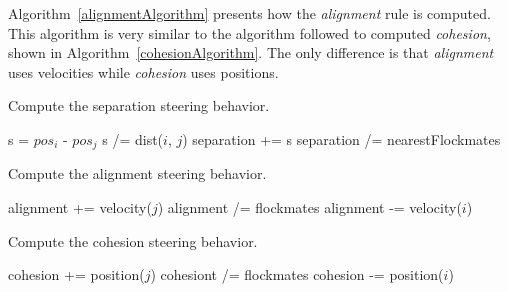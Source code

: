 Algorithm~\ref{alignmentAlgorithm} presents how the \textit{alignment} rule is computed. This algorithm is very similar to the algorithm followed to computed \textit{cohesion}, shown in Algorithm~\ref{cohesionAlgorithm}. The only difference is that \textit{alignment} uses velocities while \textit{cohesion} uses positions.

\begin{algorithm}
\caption{Compute the separation steering behavior.}
\label{separationAlgorithm}
\begin{algorithmic}
\STATE s = $pos_i$ - $pos_j$ 
\STATE s /= dist($i$, $j$) 
\STATE separation += s
\ENDIF
\ENDFOR
{}
\STATE separation /= nearestFlockmates
\ENDIF
\end{algorithmic}
\end{algorithm}




\begin{algorithm}
\caption{Compute the alignment steering behavior.}
\label{alignmentAlgorithm}
\begin{algorithmic}
\STATE alignment += velocity($j$)
\ENDIF
\ENDFOR
{}
\STATE alignment /=  flockmates
\ENDIF
\STATE alignment -= velocity($i$)
\end{algorithmic}
\end{algorithm}

\begin{algorithm}
\caption{Compute the cohesion steering behavior.}
\label{cohesionAlgorithm}
\begin{algorithmic}
\STATE cohesion += position($j$)
\ENDIF
\ENDFOR
{}
\STATE cohesiont /=  flockmates
\ENDIF
\STATE cohesion -= position($i$)
\end{algorithmic}
\end{algorithm}
